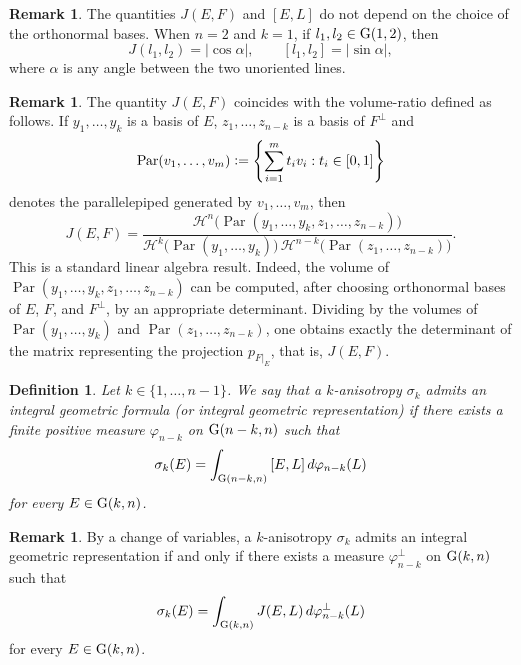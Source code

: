 \documentclass{article}
\numberwithin{equation}{section}
\theoremstyle{plain}%
\newtheorem{defin}[theorem]{Definition}
\theoremstyle{definition}
\newtheorem{rem}[theorem]{Remark}
\theoremstyle{definition}
\newcommand{\haus}{\mathcal{H}}
\newcommand{\grass}{{\rm G}}
\newcommand{\grasskn}{\grass(k,n)}
\newcommand{\grassnmenokn}{\grass(n-k,n)}
\begin{document}
\begin{rem}
The quantities $J(E,F)$ and $[E,L]$ do not depend on the choice of the orthonormal bases. When $n=2$ and $k=1$, if $l_1,l_2\in \grass(1,2)$, then
$$
J(l_1,l_2)=|\cos\alpha|,
\qquad
[l_1,l_2]=|\sin\alpha|,
$$
where $\alpha$ is any angle between the two unoriented lines.
\end{rem}
\begin{rem}\label{rem:J-volume-ratio}
The quantity $J(E,F)$ coincides with the volume-ratio
defined as follows. If $y_1,\ldots,y_k$ is a basis of $E$, $z_1,\ldots,z_{n-k}$ is a basis of $F^\perp$ and
$$
\operatorname{Par}(v_1,\ldots,v_m)\vcentcolon=
\left\{\sum_{i=1}^m t_i v_i : t_i\in[0,1]\right\}
$$
denotes the parallelepiped generated by $v_1,\ldots,v_m$, then $$
J(E,F)=
\frac{
\haus^n\bigl(\operatorname{Par}(y_1,\ldots,y_k,z_1,\ldots,z_{n-k})\bigr)
}{\haus^k\bigl(\operatorname{Par}(y_1,\ldots,y_k)\bigr)\,
\haus^{n-k}\bigl(\operatorname{Par}(z_1,\ldots,z_{n-k})\bigr)
}.
$$
This is a standard linear algebra result. Indeed, the volume of $\operatorname{Par}(y_1,\ldots,y_k,z_1,\ldots,z_{n-k})$ can be computed, after choosing orthonormal bases of $E$, $F$, and $F^\perp$, by an appropriate determinant. Dividing by the volumes of $\operatorname{Par}(y_1,\ldots,y_k)$ and $\operatorname{Par}(z_1,\ldots,z_{n-k})$, one obtains exactly the determinant of the matrix representing the projection $p_{F|_E}$, that is, $J(E,F)$.

\end{rem}


\begin{defin}\label{defformulaigperanisotropia}
    Let $k \in \{ 1, \ldots, n -1\}$. We say that a $k$-anisotropy $\sigma_k$ admits an integral geometric formula (or integral geometric representation) if there exists a finite positive measure $\varphi_{n-k}$ on $\grassnmenokn$ such that
    \begin{equation*}
        \sigma_k (E) = \int_{\grassnmenokn} {[E, L]} \, d \varphi_{n-k} (L)
    \end{equation*}
    for every $E \in \grasskn$.
\end{defin}

\begin{rem}\label{remigequivperanisotropia}
    By a change of variables, a $k$-anisotropy $\sigma_k$ admits an integral geometric representation if and only if there exists a measure $\varphi_{n-k}^{\perp}$ on $\grasskn$ such that
    \begin{equation*}
        \sigma_k (E) = \int_{\grasskn} J(E,L)\, d \varphi_{n-k}^{\perp} (L)
    \end{equation*}
    for every $E \in \grasskn$.
\end{rem}
\end{document}
